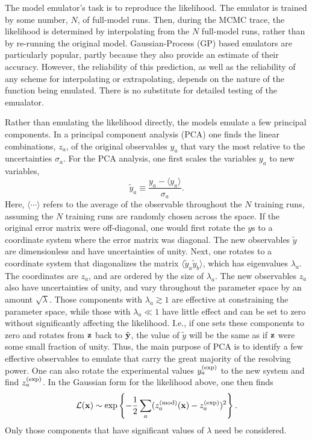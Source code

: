 The model emulator's task is to reproduce the likelihood. The emulator is trained by some number, $N$, of full-model runs. Then, during the MCMC trace, the likelihood is determined by interpolating from the $N$ full-model runs, rather than by re-running the original model. Gaussian-Process (GP) based emulators are particularly popular, partly because they also provide an estimate of their accuracy. However, the reliability of this prediction, as well as the reliability of any scheme for interpolating or extrapolating, depends on the nature of the function being emulated. There is no substitute for detailed testing of the emualator.

Rather than emulating the likelihood directly, the models emulate a few principal components. In a principal component analysis (PCA) one finds the linear combinations, $z_a$, of the original observables $y_a$ that vary the most relative to the uncertainties $\sigma_a$. For the PCA analysis, one first scales the variables $y_a$ to new variables,
\[
\tilde{y}_a\equiv \frac{y_a-\langle y_a\rangle}{\sigma_a}.
\]
Here, $\langle \cdots\rangle$ refers to the average of the observable throughout the $N$ training runs, assuming the $N$ training runs are randomly chosen across the space. If the original error matrix were off-diagonal, one would first rotate the $y$s to a coordinate system where the error matrix was diagonal. The new observables $\tilde{y}$ are dimensionless and have uncertainties of unity. Next, one rotates to a coordinate system that diagonalizes the matrix $\langle \tilde{y}_a\tilde{y}_b\rangle$, which has eigenvalues $\lambda_a$. The coordinates are $z_a$, and are ordered by the size of $\lambda_a$. The new observables $z_a$ also have uncertainties of unity, and vary throughout the parameter space by an amount $\sqrt{\lambda}$. Those components with $\lambda_a\gtrsim 1$ are effective at constraining the parameter space, while those with $\lambda_a\ll 1$ have little effect and can be set to zero without significantly affecting the likelihood. I.e., if one sets these components to zero and rotates from ${\bf z}$ back to $\tilde{\bf y}$, the value of $\tilde{y}$ will be the same as if ${\bf z}$ were some small fraction of unity. Thus, the main purpose of PCA is to identify a few effective observables to emulate that carry the great majority of the resolving power. One can also rotate the experimental values $y_a^{\rm(exp)}$ to the new system and find $z_a^{\rm(exp)}$. In the Gaussian form for the likelihood above, one then finds
\[
{\mathcal L}({\bf x})\sim \exp\left\{-\frac{1}{2}\sum_a(z^{\rm(mod)}_a({\bf x})-z_a^{\rm(exp)})^2\right\}.
\]
Only those components that have significant values of $\lambda$ need be considered.

